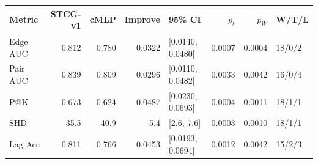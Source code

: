 \begin{tabular}{lrrrlrrl}
\toprule
Metric & STCG-v1 & cMLP & Improve & 95\% CI & $p_t$ & $p_W$ & W/T/L \\
\midrule
Edge AUC & 0.812 & 0.780 & 0.0322 & [0.0140, 0.0480] & 0.0007 & 0.0004 & 18/0/2 \\
Pair AUC & 0.839 & 0.809 & 0.0296 & [0.0110, 0.0482] & 0.0033 & 0.0042 & 16/0/4 \\
P@K & 0.673 & 0.624 & 0.0487 & [0.0230, 0.0693] & 0.0004 & 0.0011 & 18/1/1 \\
SHD & 35.5 & 40.9 & 5.4 & [2.6, 7.6] & 0.0003 & 0.0010 & 18/1/1 \\
Lag Acc & 0.811 & 0.766 & 0.0453 & [0.0193, 0.0694] & 0.0012 & 0.0042 & 15/2/3 \\
\bottomrule
\end{tabular}
